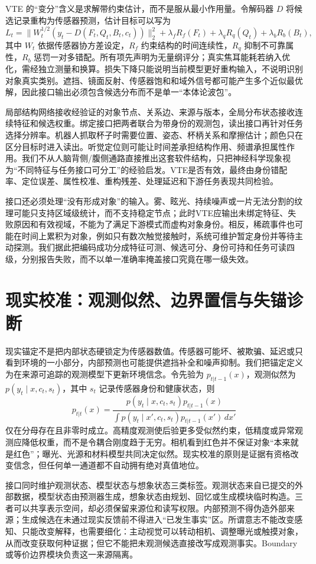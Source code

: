 VTE 的“变分”含义是求解带约束估计，而不是服从最小作用量。令解码器 $D$ 将候选记录重构为传感器预测，估计目标可以写为
\[
L_t=\|W_t^{1/2}(y_t-D(F_t,Q_t,B_t,c_t))\|_2^2
+\lambda_f R_f(F_t)+\lambda_qR_q(Q_t)+\lambda_bR_b(B_t),
\]
其中 $W_t$ 依据传感器协方差设定，$R_f$ 约束结构的时间连续性，$R_q$ 抑制不可靠属性，$R_b$ 惩罚一对多错配。所有项先声明为无量纲评分；真实焦耳能耗若纳入优化，需经独立测量和换算。损失下降只能说明当前模型更好重构输入，不说明识别对象真实类别。遮挡、镜面反射、传感器饱和和域外信号都可能产生多个近似最优解，因此接口输出必须包含候选分布而不是单一“本体论波包”。

局部结构网络接收经验证的对象节点、关系边、来源与版本，全局分布状态接收连续特征和候选权重。绑定接口把两者联合为带身份的观测包，读出接口再针对任务选择分辨率。机器人抓取杯子时需要位置、姿态、杯柄关系和摩擦估计；颜色只在区分目标时进入读出。听觉定位则可能让时间差承担结构作用、频谱承担属性作用。我们不从人脑背侧/腹侧通路直接推出这套软件结构，只把神经科学现象视为“不同特征与任务接口可分工”的经验启发。VTE是否有效，最终由身份错配率、定位误差、属性校准、重构残差、处理延迟和下游任务表现共同检验。

接口还必须处理“没有形成对象”的输入。雾、眩光、持续噪声或一片无法分割的纹理可能只支持区域级统计，而不支持稳定节点；此时VTE应输出未绑定特征、失败原因和有效视域，不能为了满足下游模式而虚构对象身份。相反，稀疏事件也可能在时间上累积为对象，例如只有数次触觉接触时，系统可维护暂定身份并等待主动探测。我们据此把编码成功分成特征可测、候选可分、身份可持和任务可读四级，分别报告失败，而不以单一准确率掩盖接口究竟在哪一级失效。

\section{现实校准：观测似然、边界置信与失锚诊断}
\label{sec:section_5326}

现实锚定不是把内部状态硬锁定为传感器数值。传感器可能坏、被欺骗、延迟或只看到环境的一小部分，内部预测也可能提供遮挡补全和噪声抑制。我们把锚定定义为在来源可追踪的观测模型下更新环境信念。令先验为 $p_{t|t-1}(x)$，观测似然为 $p(y_t\mid x,c_t,s_t)$，其中 $s_t$ 记录传感器身份和健康状态，则
\[
p_{t|t}(x)=\frac{p(y_t\mid x,c_t,s_t)p_{t|t-1}(x)}{\int p(y_t\mid x',c_t,s_t)p_{t|t-1}(x')\,dx'}
\]
仅在分母存在且非零时成立。高精度观测使后验更多受似然约束，低精度或异常观测应降低权重，而不是令耦合刚度趋于无穷。相机看到红色并不保证对象“本来就是红色”；曝光、光源和材料模型共同决定似然。现实校准的原则是证据有资格改变信念，但任何单一通道都不自动拥有绝对真值地位。

接口同时维护观测状态、模型状态与想象状态三类标签。观测状态来自已提交的外部数据，模型状态由预测器生成，想象状态由规划、回忆或生成模块临时构造。三者可以共享表示空间，却必须保留来源位和读写权限。内部预测不得伪造外部来源；生成候选在未通过现实反馈前不得进入“已发生事实”区。所谓意志不能改变感知、只能改变解释，也需要细化：主动视觉可以转动相机、调整曝光或触摸对象，从而改变获取何种证据；但它不能把未观测候选直接改写成观测事实。Boundary或等价边界模块负责这一来源隔离。

